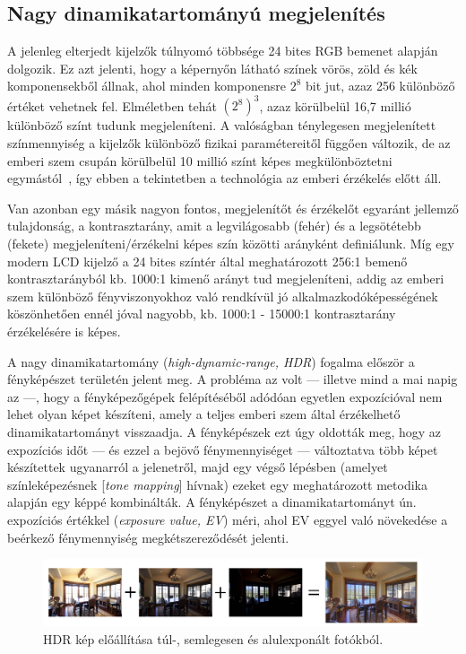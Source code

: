 \subsection{Nagy dinamikatartományú megjelenítés}

A jelenleg elterjedt kijelzők túlnyomó többsége 24 bites RGB bemenet alapján dolgozik. Ez azt jelenti, hogy a képernyőn látható színek vörös, zöld és kék komponensekből állnak, ahol minden komponensre \(2^8\) bit jut, azaz 256 különböző értéket vehetnek fel. Elméletben tehát \((2^8)^3\), azaz körülbelül 16,7 millió különböző színt tudunk megjeleníteni. A valóságban ténylegesen megjelenített színmennyiség a kijelzők különböző fizikai paramétereitől függően változik, de az emberi szem csupán körülbelül 10 millió színt képes megkülönböztetni egymástól~\cite{judd1975color}, így ebben a tekintetben a technológia az emberi érzékelés előtt áll.

Van azonban egy másik nagyon fontos, megjelenítőt és érzékelőt egyaránt jellemző tulajdonság, a kontrasztarány, amit a legvilágosabb (fehér) és a legsötétebb (fekete) megjeleníteni/érzékelni képes szín közötti arányként definiálunk. Míg egy modern LCD kijelző a 24 bites színtér által meghatározott 256:1 bemenő kontrasztarányból kb. 1000:1 kimenő arányt tud megjeleníteni, addig az emberi szem különböző fényviszonyokhoz való rendkívül jó alkalmazkodóképességének köszönhetően ennél jóval nagyobb, kb. 1000:1 - 15000:1 kontrasztarány érzékelésére is képes.~\cite{human_eye_dynamic_range}

A nagy dinamikatartomány (\textit{high-dynamic-range, HDR}) fogalma először a fényképészet területén jelent meg. A probléma az volt --- illetve mind a mai napig az ---, hogy a fényképezőgépek felépítéséből adódóan egyetlen expozícióval nem lehet olyan képet készíteni, amely a teljes emberi szem által érzékelhető dinamikatartományt visszaadja. A fényképészek ezt úgy oldották meg, hogy az expozíciós időt --- és ezzel a bejövő fénymennyiséget --- változtatva több képet készítettek ugyanarról a jelenetről, majd egy végső lépésben (amelyet színleképezésnek [\textit{tone mapping}] hívnak) ezeket egy meghatározott metodika alapján egy képpé kombinálták. A fényképészet a dinamikatartományt ún. expozíciós értékkel (\textit{exposure value, EV}) méri, ahol EV eggyel való növekedése a beérkező fénymennyiség megkétszereződését jelenti.

\begin{figure}[!ht]
    \centering
    \includegraphics[width=1.0\textwidth]{images/hdr_process.png}
    \caption{HDR kép előállítása túl-, semlegesen és alulexponált fotókból.}
\end{figure}

